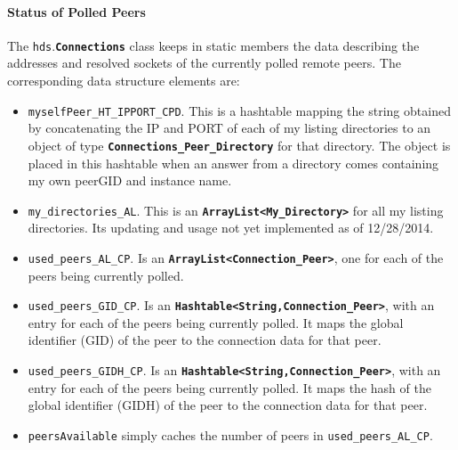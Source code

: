 \documentclass{book}
\newcommand{\pkg}[1]{{\tt #1}}
\newcommand{\cls}[1]{{\tt\bf #1}}
\newcommand{\mmb}[1]{{\tt #1}}
\begin{document}
\paragraph{Status of Polled Peers}
The \pkg{hds}.\cls{Connections} class keeps in static members the data describing the addresses and resolved sockets of the currently
polled remote peers.
The corresponding data structure elements are:
\begin{itemize}
\item
\mmb{myselfPeer\_HT\_IPPORT\_CPD}. This is a hashtable mapping the string obtained by concatenating the IP and PORT
of each of my listing directories to an object of type \cls{Connections\_Peer\_Directory} for that directory.
The object is placed in this hashtable when an answer from a directory comes containing my own peerGID and instance name.
\item
\mmb{my\_directories\_AL}. This is an \cls{ArrayList<My\_Directory>} for all my listing directories. Its updating and usage not yet implemented as of 12/28/2014.
\item
\mmb{used\_peers\_AL\_CP}. Is an \cls{ArrayList<Connection\_Peer>}, one for each of the peers being currently polled.
\item
\mmb{used\_peers\_GID\_CP}. Is an \cls{Hashtable<String,Connection\_Peer>}, with an entry for each of the peers being currently polled.
It maps the global identifier (GID) of the peer to the connection data for that peer.
\item
\mmb{used\_peers\_GIDH\_CP}. Is an \cls{Hashtable<String,Connection\_Peer>}, with an entry for each of the peers being currently polled.
It maps the hash of the global identifier (GIDH) of the peer to the connection data for that peer.
\item
\mmb{peersAvailable} simply caches the number of peers in \mmb{used\_peers\_AL\_CP}.
\end{itemize}
\end{document}
